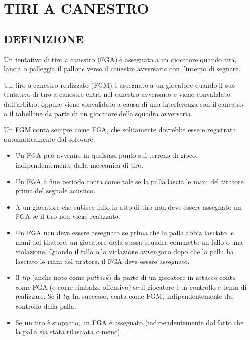 \section{TIRI A CANESTRO}
\sectionline

\subsection{DEFINIZIONE}
\subsectionline

Un tentativo di tiro a canestro (FGA) è assegnato a un giocatore quando tira, lancia o palleggia il pallone verso il canestro avversario con l'intento di segnare.

Un tiro a canestro realizzato (FGM) è assegnato a un giocatore quando il suo tentativo di tiro a canestro entra nel canestro avversario e viene convalidato dall'arbitro, oppure viene convalidato a causa di una interferenza con il canestro o il tabellone da parte di un giocatore della squadra avversaria.

Un FGM conta sempre come FGA, che solitamente dovrebbe essere registrato automaticamente dal software.

\begin{itemize}
    \item Un FGA può avvenire in qualsiasi punto sul terreno di gioco, indipendentemente dalla meccanica di tiro.
    \item Un FGA a fine periodo conta come tale se la palla lascia le mani del tiratore prima del segnale acustico.
    \item A un giocatore che subisce fallo in atto di tiro non deve essere assegnato un FGA se il tiro non viene realizzato.
    \item Un FGA non deve essere assegnato se prima che la palla abbia lasciato le mani del tiratore, un giocatore della stessa squadra commette un fallo o una violazione. Quando il fallo o la violazione avvengono dopo che la palla ha lasciato le mani del tiratore, il FGA deve essere assegnato.
    \item Il \textit{tip} (anche noto come \textit{putback}) da parte di un giocatore in attacco conta come FGA (e come rimbalzo offensivo) se il giocatore è in controllo e tenta di realizzare. Se il \textit{tip} ha successo, conta come FGM, indipendentemente dal controllo della palla.
    \item Se un tiro è stoppato, un FGA è assegnato (indipendentemente dal fatto che la palla sia stata rilasciata o meno).
\end{itemize}

